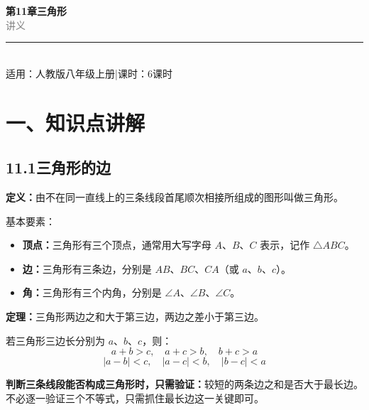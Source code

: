 \documentclass[12pt, a4paper]{ctexart}
\begin{document}
\begin{center}
{\Huge\bfseries\textcolor{mainblue}{第11章\quad 三角形}}\\[12pt]
{\Large\textcolor{gray}{讲\quad 义}}\\[8pt]
\rule{0.6\textwidth}{1pt}\\[8pt]
{\normalsize 适用：人教版\quad 八年级上册\quad |\quad 课时：6课时}
\end{center}
\vspace{10pt}

\section*{\textcolor{mainblue}{一、知识点讲解}}

\subsection*{11.1\quad 三角形的边}

\begin{knowledgebox}[三角形的定义与基本要素]
\textbf{定义：}由不在同一直线上的三条线段首尾顺次相接所组成的图形叫做三角形。

基本要素：
\begin{itemize}[nosep]
  \item \textbf{顶点：}三角形有三个顶点，通常用大写字母 $A$、$B$、$C$ 表示，记作 $\triangle ABC$。
  \item \textbf{边：}三角形有三条边，分别是 $AB$、$BC$、$CA$（或 $a$、$b$、$c$）。
  \item \textbf{角：}三角形有三个内角，分别是 $\angle A$、$\angle B$、$\angle C$。
\end{itemize}
\end{knowledgebox}

\begin{knowledgebox}[三角形的三边关系]
\textbf{定理：}三角形两边之和大于第三边，两边之差小于第三边。

若三角形三边长分别为 $a$、$b$、$c$，则：
\[
a + b > c, \quad a + c > b, \quad b + c > a
\]
\[
|a - b| < c, \quad |a - c| < b, \quad |b - c| < a
\]
\end{knowledgebox}

\begin{warnbox}[易错提醒]
\textbf{判断三条线段能否构成三角形时，只需验证：}较短的两条边之和是否大于最长边。不必逐一验证三个不等式，只需抓住最长边这一关键即可。
\end{warnbox}
\end{document}
